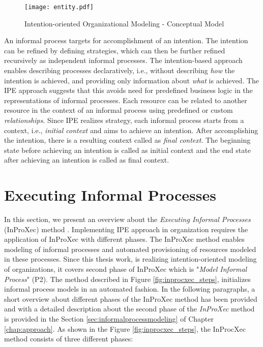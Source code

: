 \begin{figure}
	\centering
	\texttt{[image: entity.pdf]}
	\caption{Intention-oriented Organizational Modeling - Conceptual Model}
	\label{fig:entitymodel}
\end{figure}

 An informal process targets for accomplishment of an intention. The intention can be refined by defining strategies, which can then be further refined recursively as independent informal processes. The intention-based approach enables describing processes declaratively, i.e., without describing \textit{how} the intention is achieved, and providing only information about \textit{what} is achieved. The IPE approach suggests that this avoids need for predefined business logic in the representations of informal processes. Each resource can be related to another resource in the context of an informal process using predefined or custom \textit{relationships}. Since IPE realizes strategy, each informal process starts from a context, i.e., \textit{initial context} and aims to achieve an intention. After accomplishing the intention, there is a resulting context called as \textit{final context}. The beginning state before achieving an intention is called as initial context and the end state after achieving an intention is called as final context.

\section{Executing Informal Processes}
\label{sec:inproxec}
In this section, we present an overview about the \textit{Executing Informal Processes} (InProXec) method \cite{Sungur2015}. Implementing IPE approach in organization requires the application of InProXec with different phases. The InProXec method enables modeling of informal processes and automated provisioning of resources modeled in these processes. Since this thesis work, is realizing intention-oriented modeling of organizations, it covers second phase of InProXec which is "\textit{Model Informal Process}" (P2). The method described in Figure \ref{fig:inprocxec_steps}, initializes informal process models in an automated fashion. In the following paragraphs, a short overview about different phases of the InProXec method has been provided and with a detailed description about the second phase of the \textit{InProXec} method is provided in the Section \ref{sec:informalprocessmodeling} of Chapter \ref{chap:approach}. As shown in the Figure \ref{fig:inprocxec_steps}, the InProcXec method consists of three different phases:

